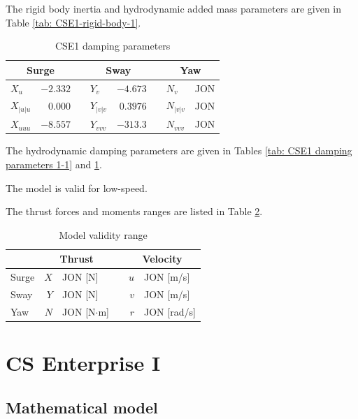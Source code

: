 \documentclass[a4paper,twoside,english]{report}
\providecommand{\tabularnewline}{\\}
\begin{document}
The rigid body inertia and hydrodynamic added mass parameters are
given in Table \ref{tab: CSE1-rigid-body-1}.

\begin{table}
\begin{centering}
\begin{tabular}{lrrlrrlr}
\multicolumn{2}{c}{Surge} &  & \multicolumn{2}{c}{Sway} &  & \multicolumn{2}{c}{Yaw}\tabularnewline
\midrule 
$X_{u}$  & $-2.332$  &  & $Y_{v}$  & $-4.673$  &  & $N_{v}$  & JON\tabularnewline
$X_{\left|u\right|u}$  & $0.000$  &  & $Y_{\left|v\right|v}$  & $0.3976$  &  & $N_{\left|v\right|v}$  & JON\tabularnewline
$X_{uuu}$  & $-8.557$  &  & $Y_{vvv}$  & $-313.3$  &  & $N_{vvv}$  & JON\tabularnewline
\bottomrule
\end{tabular}
\par\end{centering}
\caption{\label{tab: CSE1 damping parameters 2-1}CSE1 damping parameters}
\end{table}

The hydrodynamic damping parameters are given in Tables \ref{tab: CSE1 damping parameters 1-1}
and \ref{tab: CSE1 damping parameters 2-1}.

The model is valid for low-speed.

The thrust forces and moments ranges are listed in Table \ref{tab: CSEI Thust Moment-1}.
\begin{table}
\begin{centering}
\begin{tabular}{lrllrl}
 & \multicolumn{2}{c}{Thrust} &  & \multicolumn{2}{c}{Velocity}\tabularnewline
\midrule 
Surge & $X$ & JON {[}N{]} &  & $u$ & JON {[}m/s{]}\tabularnewline
Sway & $Y$ & JON {[}N{]} &  & $v$ & JON {[}m/s{]}\tabularnewline
Yaw & $N$ & JON {[}N$\cdot$m{]} &  & $r$ & JON {[}rad/s{]}\tabularnewline
\bottomrule
\end{tabular}
\par\end{centering}
\caption{\label{tab: CSEI Thust Moment-1}Model validity range}
\end{table}


\clearpage{}

\chapter{CS Enterprise I}

\section{Mathematical model}
\end{document}

